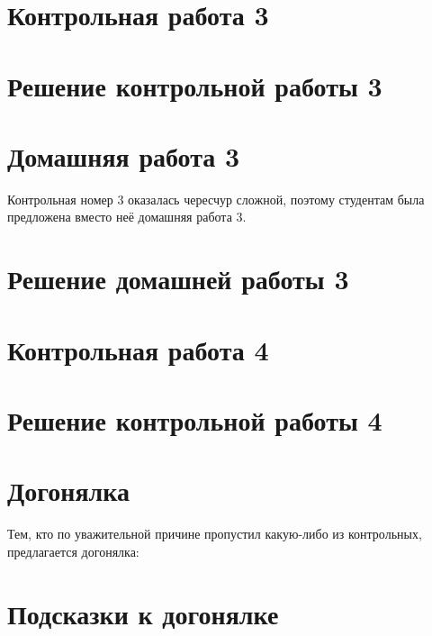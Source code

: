 \documentclass[11pt, openany]{book}
\numberwithin{equation}{page} %
\theoremstyle{definition} %
\theoremstyle{definition}
\theoremstyle{definition}
\begin{document}




\section{Контрольная работа 3}



\section{Решение контрольной  работы 3}



\section{Домашняя работа 3}

Контрольная номер 3 оказалась чересчур сложной, поэтому студентам была предложена вместо неё домашняя работа 3.




\section{Решение домашней работы 3}






\section{Контрольная работа 4}



\section{Решение контрольной работы 4}




\section{Догонялка}

Тем, кто по уважительной причине пропустил какую-либо из контрольных, предлагается догонялка:



\section{Подсказки к догонялке}
\end{document}

